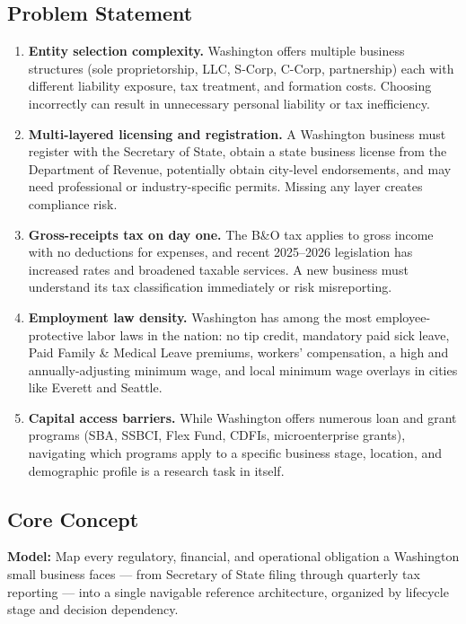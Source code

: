 \documentclass[11pt,letterpaper]{article}
\begin{document}
\subsection{Problem Statement}

\begin{enumerate}[label=\textbf{P\arabic*.}, leftmargin=2.5em]
  \item \textbf{Entity selection complexity.} Washington offers multiple business structures (sole proprietorship, LLC, S-Corp, C-Corp, partnership) each with different liability exposure, tax treatment, and formation costs. Choosing incorrectly can result in unnecessary personal liability or tax inefficiency.
  \item \textbf{Multi-layered licensing and registration.} A Washington business must register with the Secretary of State, obtain a state business license from the Department of Revenue, potentially obtain city-level endorsements, and may need professional or industry-specific permits. Missing any layer creates compliance risk.
  \item \textbf{Gross-receipts tax on day one.} The B\&O tax applies to gross income with no deductions for expenses, and recent 2025--2026 legislation has increased rates and broadened taxable services. A new business must understand its tax classification immediately or risk misreporting.
  \item \textbf{Employment law density.} Washington has among the most employee-protective labor laws in the nation: no tip credit, mandatory paid sick leave, Paid Family \& Medical Leave premiums, workers' compensation, a high and annually-adjusting minimum wage, and local minimum wage overlays in cities like Everett and Seattle.
  \item \textbf{Capital access barriers.} While Washington offers numerous loan and grant programs (SBA, SSBCI, Flex Fund, CDFIs, microenterprise grants), navigating which programs apply to a specific business stage, location, and demographic profile is a research task in itself.
\end{enumerate}

\subsection{Core Concept}

\textbf{Model:} Map every regulatory, financial, and operational obligation a Washington small business faces --- from Secretary of State filing through quarterly tax reporting --- into a single navigable reference architecture, organized by lifecycle stage and decision dependency.
\end{document}
